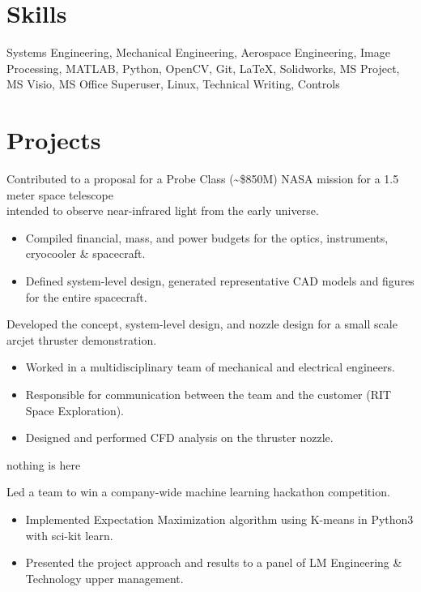 \documentclass[10pt,final,sans]{resume}
\begin{document}
\section{Skills}
Systems Engineering, Mechanical Engineering, Aerospace Engineering, Image Processing, MATLAB, Python, OpenCV, Git, {\textrm \LaTeX}, Solidworks, MS Project, MS Visio, MS Office Superuser, Linux, Technical Writing, Controls

\break
\section{Projects}
Contributed to a proposal for a Probe Class (\textasciitilde\$850M) NASA mission for a 1.5 meter space telescope \\
intended to observe near-infrared light from the early
universe.
\begin{itemize}
  \item Compiled financial, mass, and power budgets for the optics, instruments,
    cryocooler \& spacecraft.
  \item Defined system-level design, generated representative CAD models and
    figures for the entire spacecraft.
\end{itemize}

Developed the concept, system-level design, and nozzle design for a small scale arcjet thruster demonstration. 
\begin{itemize}
  \item Worked in a multidisciplinary team of mechanical and electrical engineers.
  \item Responsible for communication between the team and the customer (RIT Space Exploration).
  \item Designed and performed CFD analysis on the thruster nozzle.
\end{itemize}

nothing is here

Led a team to win a company-wide machine learning hackathon competition.
\begin{itemize}
  \item Implemented Expectation Maximization algorithm using K-means in Python3 with sci-kit learn.
  \item Presented the project approach and results to a panel of LM Engineering \& Technology upper management.
\end{itemize}
\end{document}
